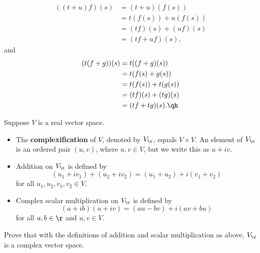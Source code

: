 \begin{sol}
\begin{enumerate}
\begin{align*}
            ((t + u)f)(s) & = (t + u)(f(s)) \\
            & = t(f(s)) + u(f(s)) \\
            & = (tf)(s) + (uf)(s) \\
            & = (tf + uf)(s),
        \end{align*}
        and
        \begin{align*}
            (t(f + g))(s) & = t((f + g)(s)) \\
            & = t(f(s) + g(s)) \\
            & = t(f(s)) + t(g(s)) \\
            & = (tf)(s) + (tg)(s) \\
            & = (tf + tg)(s). \qh
        \end{align*}
    \end{enumerate}
\end{sol}

\begin{exercise}[1b8]
    Suppose $V$ is a real vector space.
    \begin{itemize}
        \item The \textbf{complexification} of $V$, denoted by $V_{\c}$, equals $V \times V$. An element of $V_{\c}$ is an ordered pair $(u, v)$, where $u, v \in V$, but we write this as $u + iv$.
        \item Addition on $V_{\c}$ is defined by
        \[(u_1 + iv_1) + (u_2 + iv_2) = (u_1 + u_2) + i(v_1 + v_2)\]
        for all $u_1, u_2, v_1, v_2 \in V$.
        \item Complex scalar multiplication on $V_{\c}$ is defined by
        \[(a + ib)(u + iv) = (au - bv) + i(av + bu)\]
        for all $a, b \in \r$ and $u, v \in V$.
    \end{itemize}
    Prove that with the definitions of addition and scalar multiplication as above, $V_{\c}$ is a complex vector space.
\end{exercise}

